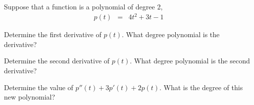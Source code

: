 



\begin{problem}
\item Suppose that a function is a polynomial of degree 2,
  \begin{eqnarray*}
    p(t) & = & 4t^2 + 3t - 1
  \end{eqnarray*}

  \begin{subproblem}
  \item Determine the first derivative of $p(t)$. What degree polynomial is
    the derivative?

    \vspace{4cm}

  \item Determine the second derivative of $p(t)$. What degree
    polynomial is the second derivative?  

    \vspace{4cm}

  \item Determine the value of $p''(t)+3p'(t)+2p(t)$. What is the
    degree of this new polynomial? 


    \vfill

  \end{subproblem}

\end{problem}


